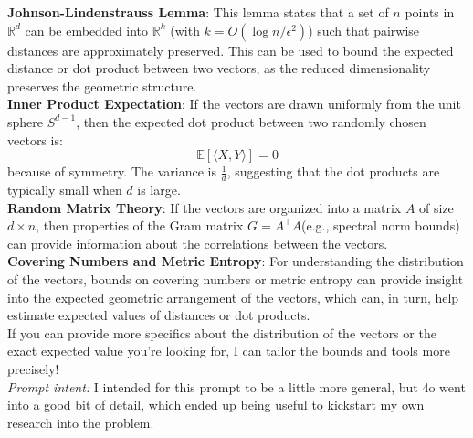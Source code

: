 \documentclass[hidelinks]{article}
\begin{document}
	\textbf{Johnson-Lindenstrauss Lemma}: This lemma states that a set of $n$ points in $\mathbb{R}^d$	can be embedded into $\mathbb{R}^k$ (with $k = O(\log n / \epsilon^2)$) such that pairwise distances are approximately preserved. This can be used to bound the expected distance or dot product between two vectors, as the reduced dimensionality preserves the geometric structure.\\
	
	\textbf{Inner Product Expectation}: If the vectors are drawn uniformly from the unit sphere $S^{d-1}$, then the expected dot product between two randomly chosen vectors is: \[\mathbb{E}[\langle X, Y \rangle] = 0\] because of symmetry. The variance is $\frac{1}{d}$, suggesting that the dot products are typically small when $d$ is large.\\
	
	\textbf{Random Matrix Theory}: If the vectors are organized into a matrix $A$ of size $d \times n$, then properties of the Gram matrix $G = A^{\intercal}A$(e.g., spectral norm bounds) can provide information about the correlations between the vectors.\\
	
	\textbf{Covering Numbers and Metric Entropy}: For understanding the distribution of the vectors, bounds on covering numbers or metric entropy can provide insight into the expected geometric arrangement of the vectors, which can, in turn, help estimate expected values of distances or dot products.\\
	
	If you can provide more specifics about the distribution of the vectors or the exact expected value you're looking for, I can tailor the bounds and tools more precisely!\\

	\textit{Prompt intent: }I intended for this prompt to be a little more general, but 4o went into a good bit of detail, which ended up being useful to kickstart my own research into the problem.
		
\end{document}
